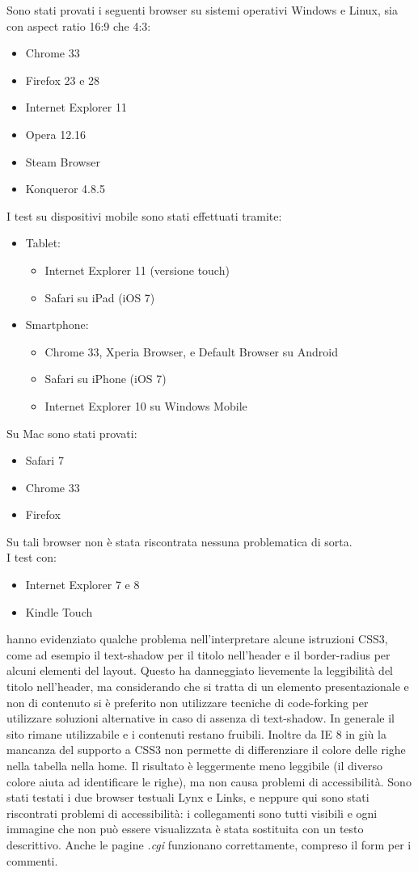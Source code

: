 \documentclass[10pt,a4paper,onecolumn]{article}
\begin{document}
Sono stati provati i seguenti browser su sistemi operativi Windows e Linux, sia con aspect ratio 16:9 che 4:3:
\begin{itemize}
 \item Chrome 33
 \item Firefox 23 e 28
 \item Internet Explorer 11
 \item Opera 12.16
 \item Steam Browser
 \item Konqueror 4.8.5
\end{itemize}
I test su dispositivi mobile sono stati effettuati tramite:
\begin{itemize}
 \item Tablet:
 \begin{itemize}
  \item Internet Explorer 11 (versione touch)
  \item Safari su iPad (iOS 7)
 \end{itemize}
 \item Smartphone:
 \begin{itemize}
  \item Chrome 33, Xperia Browser, e Default Browser su Android
  \item Safari su iPhone (iOS 7)
  \item Internet Explorer 10 su Windows Mobile
 \end{itemize}
\end{itemize}
Su Mac sono stati provati:
\begin{itemize}
 \item Safari 7
 \item Chrome 33
 \item Firefox 
\end{itemize}
Su tali browser non è stata riscontrata nessuna problematica di sorta. \\
I test con:
\begin{itemize}
 \item Internet Explorer 7 e 8
 \item Kindle Touch
\end{itemize}
hanno evidenziato qualche problema nell’interpretare alcune istruzioni CSS3, come ad esempio il text-shadow per il titolo nell’header e il border-radius per alcuni elementi del layout.
Questo ha danneggiato lievemente la leggibilità del titolo nell’header, ma considerando che si tratta di un elemento presentazionale e non di contenuto si è preferito non utilizzare tecniche di code-forking per utilizzare soluzioni alternative in caso di assenza di text-shadow.
In generale il sito rimane utilizzabile e i contenuti restano fruibili.
Inoltre da IE 8 in giù la mancanza del supporto a CSS3 non permette di differenziare il colore delle righe nella tabella nella home. Il risultato è leggermente meno leggibile (il diverso colore aiuta ad identificare le righe), ma non causa problemi di accessibilità.
Sono stati testati i due browser testuali Lynx e Links, e neppure qui sono stati riscontrati problemi di accessibilità: i collegamenti sono tutti visibili e ogni immagine che non può essere visualizzata è stata sostituita con un testo descrittivo. Anche le pagine \textit{.cgi} funzionano correttamente, compreso il form per i commenti.
\end{document}
